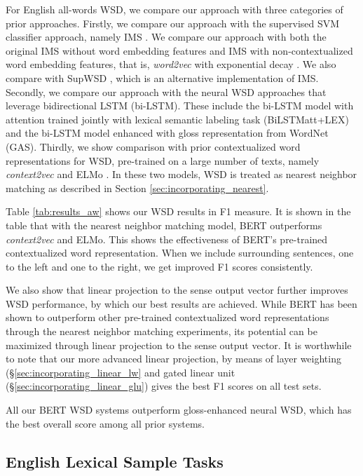 \documentclass[11pt,a4paper]{article}
\begin{document}
For English all-words WSD, we compare our approach with three categories of prior approaches. Firstly, we compare our approach with the supervised SVM classifier approach, namely IMS \cite{zhong_it_2010}. We compare our approach with both the original IMS without word embedding features and IMS with non-contextualized word embedding features, that is, \textit{word2vec} with exponential decay \cite{iacobacci_embeddings_2016}. We also compare with SupWSD \cite{papandrea_supwsd:_2017}, which is an alternative implementation of IMS. Secondly, we compare our approach with the neural WSD approaches that leverage bidirectional LSTM (bi-LSTM). These include the bi-LSTM model with attention trained jointly with lexical semantic labeling task \cite{raganato_neural_2017} (BiLSTMatt+LEX) and the bi-LSTM model enhanced with gloss representation from WordNet (GAS). Thirdly, we show comparison with prior contextualized word representations for WSD, pre-trained on a large number of texts, namely \textit{context2vec} \cite{melamud_context2vec:_2016} and ELMo \cite{peters_deep_2018}. In these two models, WSD is treated as nearest neighbor matching as described in Section \ref{sec:incorporating_nearest}.

Table \ref{tab:results_aw} shows our WSD results in F1 measure. It is shown in the table that with the nearest neighbor matching model, BERT outperforms \textit{context2vec} and ELMo. This shows the effectiveness of BERT's pre-trained contextualized word representation. When we include surrounding sentences, one to the left and one to the right, we get improved F1 scores consistently.

We also show that linear projection to the sense output vector further improves WSD performance, by which our best results are achieved. While BERT has been shown to outperform other pre-trained contextualized word representations through the nearest neighbor matching experiments, its potential can be maximized through linear projection to the sense output vector. It is worthwhile to note that our more advanced linear projection, by means of layer weighting (\S\ref{sec:incorporating_linear_lw} and gated linear unit (\S\ref{sec:incorporating_linear_glu}) gives the best F1 scores on all test sets.

All our BERT WSD systems outperform gloss-enhanced neural WSD, which has the best overall score among all prior systems.

\subsection{English Lexical Sample Tasks}
\label{sec:results_ls}
\end{document}

